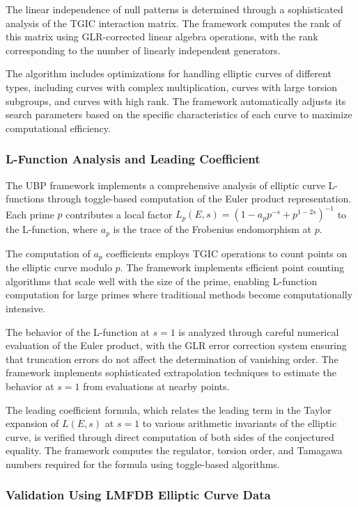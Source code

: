 \documentclass[11pt]{amsart}
\begin{document}
The linear independence of null patterns is determined through a sophisticated analysis of the TGIC interaction matrix. The framework computes the rank of this matrix using GLR-corrected linear algebra operations, with the rank corresponding to the number of linearly independent generators.

The algorithm includes optimizations for handling elliptic curves of different types, including curves with complex multiplication, curves with large torsion subgroups, and curves with high rank. The framework automatically adjusts its search parameters based on the specific characteristics of each curve to maximize computational efficiency.

\subsubsection{L-Function Analysis and Leading Coefficient}

The UBP framework implements a comprehensive analysis of elliptic curve L-functions through toggle-based computation of the Euler product representation. Each prime $p$ contributes a local factor $L_p(E,s) = (1 - a_p p^{-s} + p^{1-2s})^{-1}$ to the L-function, where $a_p$ is the trace of the Frobenius endomorphism at $p$.

The computation of $a_p$ coefficients employs TGIC operations to count points on the elliptic curve modulo $p$. The framework implements efficient point counting algorithms that scale well with the size of the prime, enabling L-function computation for large primes where traditional methods become computationally intensive.

The behavior of the L-function at $s = 1$ is analyzed through careful numerical evaluation of the Euler product, with the GLR error correction system ensuring that truncation errors do not affect the determination of vanishing order. The framework implements sophisticated extrapolation techniques to estimate the behavior at $s = 1$ from evaluations at nearby points.

The leading coefficient formula, which relates the leading term in the Taylor expansion of $L(E,s)$ at $s = 1$ to various arithmetic invariants of the elliptic curve, is verified through direct computation of both sides of the conjectured equality. The framework computes the regulator, torsion order, and Tamagawa numbers required for the formula using toggle-based algorithms.

\subsubsection{Validation Using LMFDB Elliptic Curve Data}
\end{document}
